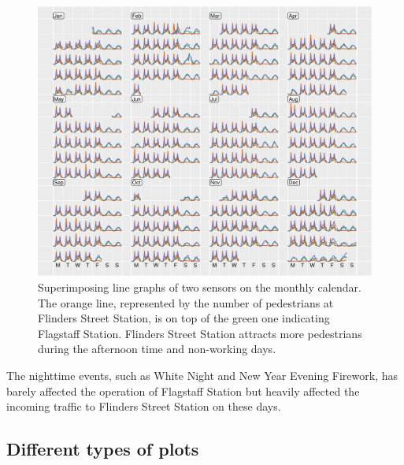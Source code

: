 \documentclass[article]{jss}
\begin{document}
\begin{CodeChunk}
\begin{figure}

{\centering \includegraphics[width=\textwidth]{figure/overlay-1} 

}

\caption[Superimposing line graphs of two sensors on the monthly calendar]{Superimposing line graphs of two sensors on the monthly calendar. The orange line, represented by the number of pedestrians at Flinders Street Station, is on top of the green one indicating Flagstaff Station. Flinders Street Station attracts more pedestrians during the afternoon time and non-working days.}\label{fig:overlay}
\end{figure}
\end{CodeChunk}

The nighttime events, such as White Night and New Year Evening Firework,
has barely affected the operation of Flagstaff Station but heavily
affected the incoming traffic to Flinders Street Station on these days.

\subsection{Different types of plots}\label{different-types-of-plots}
\end{document}
